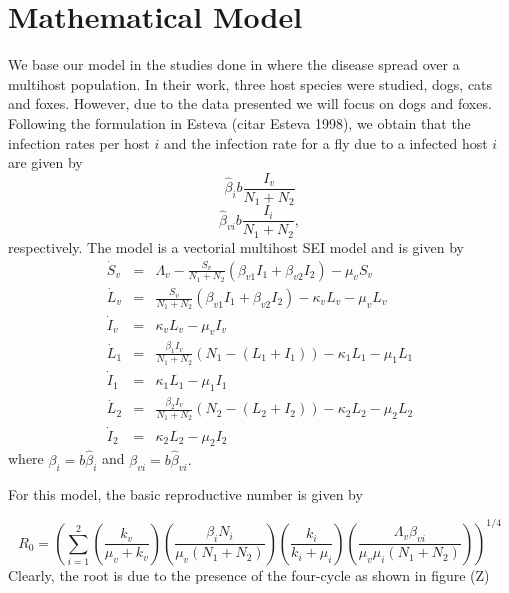 \documentclass[preprint,12pt]{elsarticle}
\begin{document}
\section{Mathematical Model}

\noindent We base our model in the studies done in \cite{Otranto:2003} where the disease spread over a multihost population. In their work, three host species were studied, dogs, cats and foxes. However, due to the data presented we will focus on dogs and foxes. Following the formulation in Esteva (citar Esteva 1998), we obtain that the infection rates per host $i$ and the infection rate for a fly due to a infected host $i$ are given by
$$ \hat{\beta}_ib\frac{I_v}{N_1+N_2}$$
$$ \hat{\beta}_{vi}b\frac{I_i}{N_1+N_2},$$
respectively.  
\noindent The model is a vectorial multihost SEI model and is given by
\begin{equation}
\begin{array}{lcl}
\dot{S}_v&=&\Lambda_v-\frac{S_v}{N_1+N_2}\left(\beta_{v1}I_1+\beta_{v2}I_2\right)-\mu_vS_v\\
\dot{L}_v&=&\frac{S_v}{N_1+N_2}\left(\beta_{v1}I_1+\beta_{v2}I_2\right)-\kappa_vL_v-\mu_vL_v\\
\dot{I}_v&=&\kappa_vL_v-\mu_vI_v\\
\dot{L}_1&=&\frac{\beta_1I_v}{N_1+N_2}\left(N_1-\left(L_1+I_1\right)\right)-\kappa_1L_1 -\mu_1 L_1 \\
\dot{I}_1&=& \kappa_1L_1-\mu_1I_1\\
\dot{L}_2&=&\frac{\beta_2I_v}{N_1+N_2}\left(N_2-\left(L_2+I_2\right)\right)-\kappa_2L_2 -\mu_2 L_2 \\
\dot{I}_2&=& \kappa_2L_2-\mu_2I_2
\end{array}
\end{equation}
where $\beta_i=b\hat{\beta}_i$ and $\beta_{vi}=b\hat{\beta}_{vi}.$


For this model, the basic reproductive number is given by

 \begin{equation}
     R_0=\left(\sum_{i=1}^{2}\left(\frac{k_v}{\mu_v+k_v}\right)\left(\frac{\beta_iN_i}{\mu_v(N_1+N_2)}\right)\left(\frac{k_i}{k_i+\mu_i}\right)\left(\frac{\Lambda_v\beta_{vi}}{\mu_v\mu_i(N_1+N_2)} \right) \right)^{1/4}
 \end{equation}
Clearly, the root is due to the presence of the four-cycle as shown in figure (Z)
\end{document}
